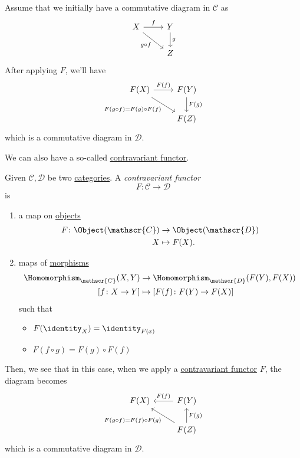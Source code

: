 \begin{prev}
	Assume that we initially have a commutative diagram in \(\mathscr{C} \) as
	\[
		\begin{tikzcd}
			X \ar[rd, "g\circ f"']\ar[r, "f"] & Y\ar[d, "g"]\\
			& Z
		\end{tikzcd}
	\]
	After applying \(F\), we'll have
	\[
		\begin{tikzcd}
			F(X) \ar[rd, "F(g\circ f)=F(g)\circ F(f)"']\ar[r, "F(f)"] & F(Y)\ar[d, "F(g)"]\\
			& F(Z)
		\end{tikzcd}
	\]
	which is a commutative diagram in \(\mathscr{D}\).
\end{prev}

We can also have a so-called \underline{contravariant \hyperref[def:functor]{functor}}.
\begin{definition}\label{def:contravariant-functor}
	Given \(\mathscr{C} , \mathscr{D} \) be two \hyperref[def:category]{categories}. A \emph{contravariant functor}
	\[
		F\colon \mathscr{C} \to \mathscr{D}
	\]
	is
	\begin{enumerate}
		\item a map on \hyperref[def:object]{objects}
		      \[
			      \begin{split}
				      F\colon \Object(\mathscr{C} )&\to \Object(\mathscr{D} )\\
				      X&\mapsto F(X).
			      \end{split}
		      \]
		\item maps of \hyperref[def:morphism]{morphisms}
		      \[
			      \begin{split}
				      \Homomorphism_{\mathscr{C} }(X, Y)&\to \Homomorphism_{\mathscr{D} }(F(Y), F(X))\\
				      \left[f\colon X\to Y\right] &\mapsto \left[F(f)\colon F(Y)\to F(X)\right]
			      \end{split}
		      \]
		      such that
		      \begin{itemize}
			      \item \(F(\identity_{X} ) = \identity_{F(x)} \)
			      \item \(F(f\circ g) = F(g)\circ F(f)\)
		      \end{itemize}
	\end{enumerate}
\end{definition}

Then, we see that in this case, when we apply a \hyperref[def:contravariant-functor]{contravariant functor} \(F\), the diagram becomes
\[
	\begin{tikzcd}
		F(X)  & F(Y)\ar[l, "F(f)"']\\
		& F(Z)\ar[lu, "F(g\circ f)=F(f)\circ F(g)"]\ar[u, "F(g)"']
	\end{tikzcd}
\]
which is a commutative diagram in \(\mathscr{D}\).


